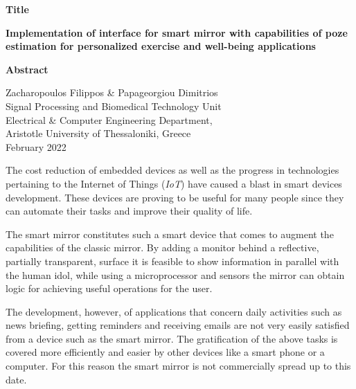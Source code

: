 {\selectfont

{}


\begin{center}
  \centering
  \textbf{\Large{Title}}
  \vspace{0.5cm}

  \textbf{\large{Implementation of interface for smart mirror with capabilities of poze estimation for personalized exercise and well-being applications}}

  \vspace{1cm}

  \centering
  \textbf{Abstract}
\end{center}


\begin{flushright}
  \vspace{2cm}
  Zacharopoulos Filippos \& Papageorgiou Dimitrios
  \\
  Signal Processing and Biomedical Technology Unit
  \\
  Electrical \& Computer Engineering Department,
  \\
  Aristotle University of Thessaloniki, Greece
  \\
  February 2022
\end{flushright}

}

The cost reduction of embedded devices as well as the progress in technologies pertaining to the Internet of Things (\textit{IoT}) have caused a blast in smart devices development. These devices are proving to be useful for many people since they can automate their tasks and improve their quality of life.

The smart mirror constitutes such a smart device that comes to augment the capabilities of the classic mirror. By adding a monitor behind a reflective, partially transparent, surface it is feasible to show information in parallel with the human idol, while using a microprocessor and sensors the mirror can obtain logic for achieving useful operations for the user.

The development, however, of applications that concern daily activities such as news briefing, getting reminders and receiving emails are not very easily satisfied from a device such as the smart mirror. The gratification of the above tasks is covered more efficiently and easier by other devices like a smart phone or a computer. For this reason the smart mirror is not commercially spread up to this date.

